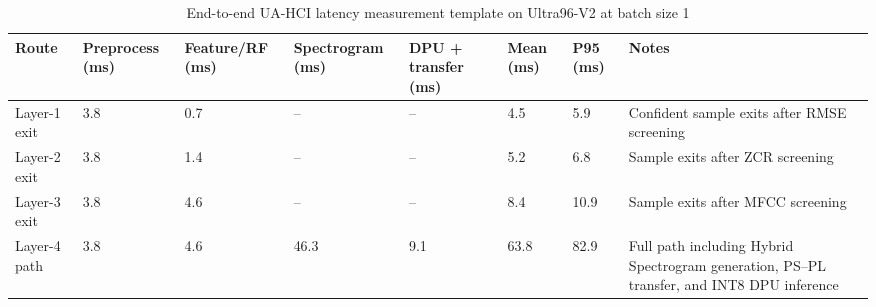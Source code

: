 \begin{table}[!t]
\centering
\caption{End-to-end UA-HCI latency measurement template on Ultra96-V2 at batch size 1}
\label{tab:e2e_latency}
\footnotesize
\setlength{\tabcolsep}{3pt}
\renewcommand{\arraystretch}{1.15}
\begin{tabularx}{\textwidth}{@{}p{2.0cm}p{1.8cm}p{1.8cm}p{1.8cm}p{1.8cm}p{1.6cm}p{1.6cm}X@{}}
\toprule
\textbf{Route} & \textbf{Preprocess (ms)} & \textbf{Feature/RF (ms)} & \textbf{Spectrogram (ms)} & \textbf{DPU + transfer (ms)} & \textbf{Mean (ms)} & \textbf{P95 (ms)} & \textbf{Notes} \\
\midrule
Layer-1 exit & 3.8 & 0.7 & -- & -- & 4.5 & 5.9 & Confident sample exits after RMSE screening \\
Layer-2 exit & 3.8 & 1.4 & -- & -- & 5.2 & 6.8 & Sample exits after ZCR screening \\
Layer-3 exit & 3.8 & 4.6 & -- & -- & 8.4 & 10.9 & Sample exits after MFCC screening \\
Layer-4 path & 3.8 & 4.6 & 46.3 & 9.1 & 63.8 & 82.9 & Full path including Hybrid Spectrogram generation, PS--PL transfer, and INT8 DPU inference \\
\bottomrule
\end{tabularx}
\end{table}
